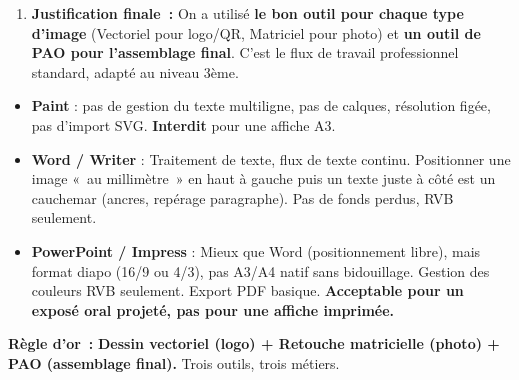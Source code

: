 \documentclass[11pt]{article}
\begin{document}
\begin{exoresolu}
\begin{enumerate}
\begin{enumerate}
        \item \textbf{PAO (Choix selon dispo)~:}
        \begin{itemize}
            \item \textbf{CDI (Publisher)~:} Nouveau document A3. Insérer \texttt{logo\_ecole.svg} (Publisher importe SVG), \texttt{photo\_kermesse\_prete.jpg}, \texttt{qrcode\_inscription.svg}. Créer cadres texte pour infos. Aligner sur guides. Exporter \texttt{PDF Impression}.
            \item \textbf{Maison (Canva)~:} Modèle «~Affiche événement A3~». Upload SVG (Canva gère SVG). Même assemblage. Télécharger \texttt{PDF Impression}.
            \item \textbf{CDI Linux / Sans licence (Scribus)~:} Nouveau document A3, marges 10~mm, fonds perdus 3~mm (même si photocopieuse ne coupe pas, bonne habitude). Importer SVG (Fichier > Importer > Vectoriel), images, cadres texte. Styles de paragraphe pour titre/sous-titre/texte. Exporter \texttt{PDF/X-1a} (robuste).
        \end{itemize}
    \end{enumerate}
    \item \textbf{Justification finale~:} On a utilisé \textbf{le bon outil pour chaque type d'image} (Vectoriel pour logo/QR, Matriciel pour photo) et \textbf{un outil de PAO pour l'assemblage final}. C'est le flux de travail professionnel standard, adapté au niveau 3ème.
\end{enumerate}
\end{exoresolu}

\begin{attention}
\begin{itemize}
    \item \textbf{Paint} : pas de gestion du texte multiligne, pas de calques, résolution figée, pas d'import SVG. \textbf{Interdit} pour une affiche A3.
    \item \textbf{Word / Writer} : Traitement de texte, flux de texte continu. Positionner une image «~au millimètre~» en haut à gauche puis un texte juste à côté est un cauchemar (ancres, repérage paragraphe). Pas de fonds perdus, RVB seulement.
    \item \textbf{PowerPoint / Impress} : Mieux que Word (positionnement libre), mais format diapo (16/9 ou 4/3), pas A3/A4 natif sans bidouillage. Gestion des couleurs RVB seulement. Export PDF basique. \textbf{Acceptable pour un exposé oral projeté, pas pour une affiche imprimée.}
\end{itemize}
\textbf{Règle d'or~:} \textbf{Dessin vectoriel (logo) + Retouche matricielle (photo) + PAO (assemblage final).} Trois outils, trois métiers.
\end{attention}
\end{document}
